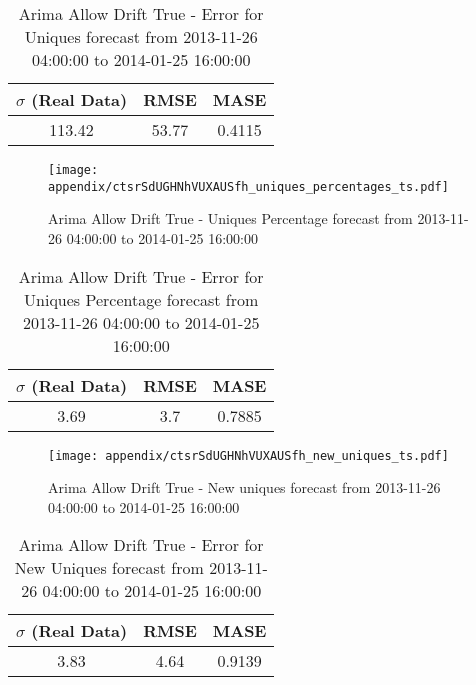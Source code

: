 \begin{table}[H]
\centering
\footnotesize
\begin{tabular}{ccc}
$\sigma$ (Real Data) & RMSE & MASE   \\ \hline
113.42 & 53.77 & 0.4115 \\
\end{tabular}

\vspace{0.5cm}

\caption{
Arima Allow Drift True - Error for Uniques forecast from 2013-11-26 04:00:00 to 2014-01-25 16:00:00}
\end{table}

\begin{figure}[H] \begin{center} \leavevmode
\texttt{[image: appendix/ctsrSdUGHNhVUXAUSfh\_uniques\_percentages\_ts.pdf]} \caption{
Arima Allow Drift True - Uniques Percentage forecast from 2013-11-26 04:00:00 to 2014-01-25 16:00:00} \label{fig:appendix/ctsrSdUGHNhVUXAUSfh_uniques_percentages_ts.pdf} \end{center}
\end{figure}

\begin{table}[H]
\centering
\footnotesize
\begin{tabular}{ccc}
$\sigma$ (Real Data) & RMSE & MASE   \\ \hline
3.69 & 3.7 & 0.7885 \\
\end{tabular}

\vspace{0.5cm}

\caption{
Arima Allow Drift True - Error for Uniques Percentage forecast from 2013-11-26 04:00:00 to 2014-01-25 16:00:00}
\end{table}

\begin{figure}[H] \begin{center} \leavevmode
\texttt{[image: appendix/ctsrSdUGHNhVUXAUSfh\_new\_uniques\_ts.pdf]} \caption{
Arima Allow Drift True - New uniques forecast from 2013-11-26 04:00:00 to 2014-01-25 16:00:00} \label{fig:appendix/ctsrSdUGHNhVUXAUSfh_new_uniques_ts.pdf} \end{center}
\end{figure}

\begin{table}[H]
\centering
\footnotesize
\begin{tabular}{ccc}
$\sigma$ (Real Data) & RMSE & MASE   \\ \hline
3.83 & 4.64 & 0.9139 \\
\end{tabular}

\vspace{0.5cm}

\caption{
Arima Allow Drift True - Error for New Uniques forecast from 2013-11-26 04:00:00 to 2014-01-25 16:00:00}
\end{table}

